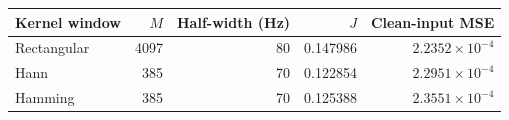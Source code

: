 \begin{tabular}{lrrrr}
\toprule
Kernel window & $M$ & Half-width (Hz) & $J$ & Clean-input MSE \\
\midrule
Rectangular & 4097 & 80 & 0.147986 & $2.2352\times10^{-4}$ \\
Hann & 385 & 70 & 0.122854 & $2.2951\times10^{-4}$ \\
Hamming & 385 & 70 & 0.125388 & $2.3551\times10^{-4}$ \\
\bottomrule
\end{tabular}
